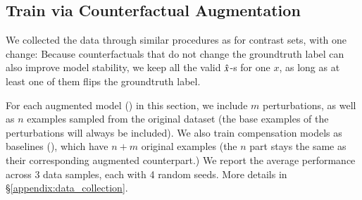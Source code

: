\TableAugSST
\TableAugNLI

\subsection{Train via Counterfactual Augmentation}
\label{subsec:augmentation}
We collected the data through similar procedures as for contrast sets, with one change:
Because counterfactuals that do not change the groundtruth label can also improve model stability, we keep all the valid $\hat{x}$-s for one $x$, as long as at least one of them flips the groundtruth label.

For each augmented model (\maug) in this section, we include $m$ perturbations, as well as $n$ examples sampled from the original dataset (the base examples of the perturbations will always be included).
We also train compensation models as baselines (\mcomp), which have $n+m$ original examples (the $n$ part stays the same as their corresponding augmented counterpart.)
We report the average performance across 3 data samples, each with 4 random seeds. More details in \S\ref{appendix:data_collection}.

